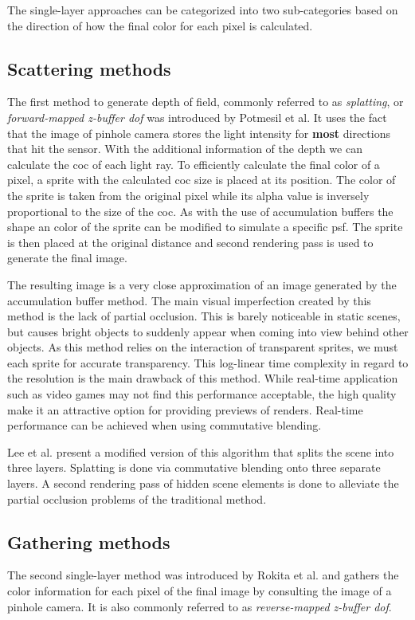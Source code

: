 The single-layer approaches can be categorized into two sub-categories based on the direction of how the final color for each pixel is calculated.

\subsection{Scattering methods}
The first method to generate depth of field, commonly referred to as \textit{splatting}, or \textit{forward-mapped z-buffer \gls{dof}} was introduced by Potmesil et al.\cite{Potmesil.1981}
It uses the fact that the image of pinhole camera stores the light intensity for \textbf{most} directions that hit the sensor.
With the additional information of the depth we can calculate the \gls{coc} of each light ray.
To efficiently calculate the final color of a pixel, a sprite with the calculated \gls{coc} size is placed at its position.
The color of the sprite is taken from the original pixel while its alpha value is inversely proportional to the size of the \gls{coc}.
As with the use of accumulation buffers the shape an color of the sprite can be modified to simulate a specific \gls{psf}.
The sprite is then placed at the original distance and second rendering pass is used to generate the final image.

The resulting image is a very close approximation of an image generated by the accumulation buffer method.
The main visual imperfection created by this method is the lack of partial occlusion.
This is barely noticeable in static scenes, but causes bright objects to suddenly appear when coming into view behind other objects.
As this method relies on the interaction of transparent sprites, we must each sprite for accurate transparency.
This log-linear time complexity in regard to the resolution is the main drawback of this method.
While real-time application such as video games may not find this performance acceptable, the high quality make it an attractive option for providing previews of renders.\cite{Demers.2005}
Real-time performance can be achieved when using commutative blending.

Lee et al. \cite{Lee.2008} present a modified version of this algorithm that splits the scene into three layers.
Splatting is done via commutative blending onto three separate layers.
A second rendering pass of hidden scene elements is done to alleviate the partial occlusion problems of the traditional method.

\subsection{Gathering methods}
The second single-layer method was introduced by Rokita et al. \cite{Rokita.1993} and gathers the color information for each pixel of the final image by consulting the image of a pinhole camera.
It is also commonly referred to as \textit{reverse-mapped z-buffer \gls{dof}}.\cite{Gilham.2007}

